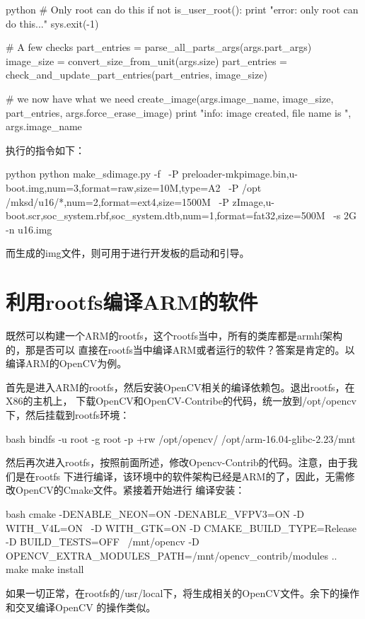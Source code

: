 \begin{code-block}{python}
# Only root can do this
if not is_user_root():
    print "error: only root can do this..."
    sys.exit(-1)

# A few checks
part_entries = parse_all_parts_args(args.part_args)
image_size = convert_size_from_unit(args.size)
part_entries = check_and_update_part_entries(part_entries, image_size)

# we now have what we need
create_image(args.image_name, image_size, part_entries, args.force_erase_image)
print "info: image created, file name is ", args.image_name
\end{code-block}

执行的指令如下：
\begin{code-block}{python}
python make_sdimage.py -f \
    -P preloader-mkpimage.bin,u-boot.img,num=3,format=raw,size=10M,type=A2 \
    -P /opt /mksd/u16/*,num=2,format=ext4,size=1500M \
    -P zImage,u-boot.scr,soc_system.rbf,soc_system.dtb,num=1,format=fat32,size=500M \
    -s 2G -n u16.img
\end{code-block}

而生成的img文件，则可用于进行开发板的启动和引导。

\section{利用rootfs编译ARM的软件}
既然可以构建一个ARM的rootfs，这个rootfs当中，所有的类库都是armhf架构的，那是否可以
直接在rootfs当中编译ARM或者运行的软件？答案是肯定的。以编译ARM的OpenCV为例。

首先是进入ARM的rootfs，然后安装OpenCV相关的编译依赖包。退出rootfs，在X86的主机上，
下载OpenCV和OpenCV-Contribe的代码，统一放到/opt/opencv下，然后挂载到rootfs环境：
\begin{code-block}{bash}
bindfs -u root -g root -p +rw /opt/opencv/ /opt/arm-16.04-glibc-2.23/mnt
\end{code-block}

然后再次进入rootfs，按照前面所述，修改Opencv-Contrib的代码。注意，由于我们是在rootfs
下进行编译，该环境中的软件架构已经是ARM的了，因此，无需修改OpenCV的Cmake文件。紧接着开始进行
编译安装：
\begin{code-block}{bash}
cmake -DENABLE_NEON=ON -DENABLE_VFPV3=ON  -D WITH_V4L=ON  \
    -D WITH_GTK=ON -D CMAKE_BUILD_TYPE=Release -D BUILD_TESTS=OFF  \
    /mnt/opencv -D OPENCV_EXTRA_MODULES_PATH=/mnt/opencv_contrib/modules ..
make
make install
\end{code-block}

如果一切正常，在rootfs的/usr/local下，将生成相关的OpenCV文件。余下的操作和交叉编译OpenCV
的操作类似。

